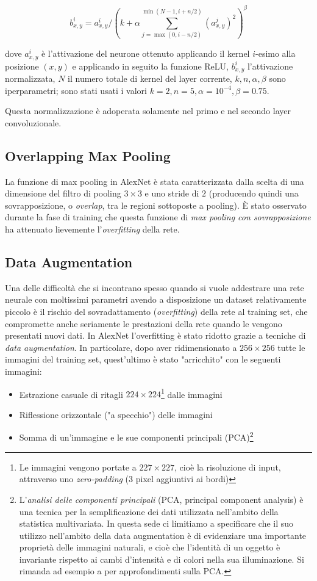 \[b_{x,y}^{i}=a_{x,y}^{i}/\left(k+\alpha \sum_{j=\max(0,i-n/2)}^{\min(N-1,i+n/2)}(a_{x,y}^{j})^{2}\right)^{\beta}\]

dove $a_{x,y}^{i}$ è l'attivazione del neurone ottenuto applicando il kernel $i$-esimo alla posizione $(x,y)$ e applicando in seguito la funzione ReLU, $b_{x,y}^{i}$ l'attivazione normalizzata, $N$ il numero totale di kernel del layer corrente, $k, n, \alpha, \beta$ sono iperparametri; sono stati usati i valori $k=2, n=5, \alpha=10^{-4}, \beta=0.75$.

Questa normalizzazione è adoperata solamente nel primo e nel secondo layer convoluzionale.

\subsection{Overlapping Max Pooling}
La funzione di max pooling in AlexNet è stata caratterizzata dalla scelta di una dimensione del filtro di pooling $3\times 3$ e uno stride di $2$ (producendo quindi una sovrapposizione, o \textit{overlap}, tra le regioni sottoposte a pooling). È stato osservato durante la fase di training che questa funzione di \textit{max pooling con sovrapposizione} ha attenuato lievemente l'\textit{overfitting} della rete.

\subsection{Data Augmentation}
Una delle difficoltà che si incontrano spesso quando si vuole addestrare una rete neurale con moltissimi parametri avendo a disposizione un dataset relativamente piccolo è il rischio del sovradattamento (\textit{overfitting}) della rete al training set, che compromette anche seriamente le prestazioni della rete quando le vengono presentati nuovi dati.
In AlexNet l'overfitting è stato ridotto grazie a tecniche di \textit{data augmentation}. In particolare, dopo aver ridimensionato a $256\times 256$ tutte le immagini del training set, quest'ultimo è stato "arricchito" con le seguenti immagini:
\begin{itemize}
\item Estrazione casuale di ritagli $224\times 224$\footnote{Le immagini vengono portate a $227\times 227$, cioè la risoluzione di input, attraverso uno \textit{zero-padding} (3 pixel aggiuntivi ai bordi)} dalle immagini
\item Riflessione orizzontale ("a specchio") delle immagini
\item Somma di un'immagine e le sue componenti principali (PCA)\footnote{L'\textit{analisi delle componenti principali} (PCA, principal component analysis) è una tecnica per la semplificazione dei dati utilizzata nell'ambito della statistica multivariata. In questa sede ci limitiamo a specificare che il suo utilizzo nell'ambito della data augmentation è di evidenziare una importante proprietà delle immagini naturali, e cioè che l'identità di un oggetto è invariante rispetto ai cambi d'intensità e di colori nella sua illuminazione. Si rimanda ad esempio a \cite{PCA} per approfondimenti sulla PCA.}
\end{itemize}

